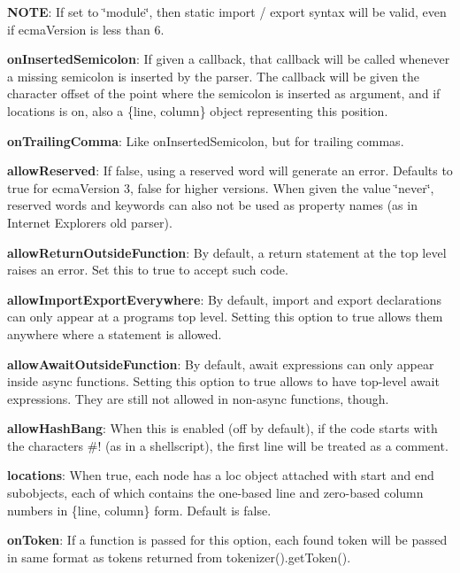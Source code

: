 \begin{DoxyItemize}
{\bfseries N\+O\+TE}\+: If set to {\ttfamily \char`\"{}module\char`\"{}}, then static {\ttfamily import} / {\ttfamily export} syntax will be valid, even if {\ttfamily ecma\+Version} is less than 6.
\item {\bfseries on\+Inserted\+Semicolon}\+: If given a callback, that callback will be called whenever a missing semicolon is inserted by the parser. The callback will be given the character offset of the point where the semicolon is inserted as argument, and if {\ttfamily locations} is on, also a {\ttfamily \{line, column\}} object representing this position.
\item {\bfseries on\+Trailing\+Comma}\+: Like {\ttfamily on\+Inserted\+Semicolon}, but for trailing commas.
\item {\bfseries allow\+Reserved}\+: If {\ttfamily false}, using a reserved word will generate an error. Defaults to {\ttfamily true} for {\ttfamily ecma\+Version} 3, {\ttfamily false} for higher versions. When given the value {\ttfamily \char`\"{}never\char`\"{}}, reserved words and keywords can also not be used as property names (as in Internet Explorer\textquotesingle{}s old parser).
\item {\bfseries allow\+Return\+Outside\+Function}\+: By default, a return statement at the top level raises an error. Set this to {\ttfamily true} to accept such code.
\item {\bfseries allow\+Import\+Export\+Everywhere}\+: By default, {\ttfamily import} and {\ttfamily export} declarations can only appear at a program\textquotesingle{}s top level. Setting this option to {\ttfamily true} allows them anywhere where a statement is allowed.
\item {\bfseries allow\+Await\+Outside\+Function}\+: By default, {\ttfamily await} expressions can only appear inside {\ttfamily async} functions. Setting this option to {\ttfamily true} allows to have top-\/level {\ttfamily await} expressions. They are still not allowed in non-\/{\ttfamily async} functions, though.
\item {\bfseries allow\+Hash\+Bang}\+: When this is enabled (off by default), if the code starts with the characters {\ttfamily \#!} (as in a shellscript), the first line will be treated as a comment.
\item {\bfseries locations}\+: When {\ttfamily true}, each node has a {\ttfamily loc} object attached with {\ttfamily start} and {\ttfamily end} subobjects, each of which contains the one-\/based line and zero-\/based column numbers in {\ttfamily \{line, column\}} form. Default is {\ttfamily false}.
\item {\bfseries on\+Token}\+: If a function is passed for this option, each found token will be passed in same format as tokens returned from {\ttfamily tokenizer().get\+Token()}.


\end{DoxyItemize}
